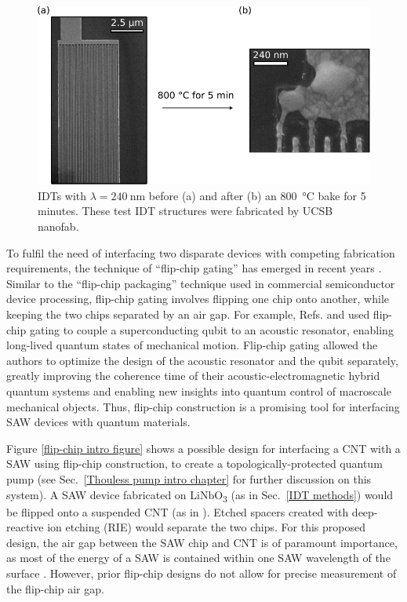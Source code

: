 \documentclass[double,12pt,1in,seploa]{beavtex}
\begin{document}
\begin{figure}
    \includegraphics{IDT damaged.pdf}
    \caption{IDTs with $\lambda = \SI{240}{\nano\meter}$ before (a) and after (b) an \SI{800}{\celsius} bake for 5 minutes. These test IDT structures were fabricated by UCSB nanofab.} 
    \label{IDT damaged}
\end{figure}

To fulfil the need of interfacing two disparate devices with competing fabrication requirements, the technique of “flip-chip gating” has emerged in recent years \cite{beukman_noninvasive_2015, chu_creation_2018, satzinger_quantum_2018, robertson_non-invasive_2020}. Similar to the “flip-chip packaging” technique used in commercial semiconductor device processing, flip-chip gating involves flipping one chip onto another, while keeping the two chips separated by an air gap. For example, Refs. \cite{chu_creation_2018} and \cite{satzinger_quantum_2018} used flip-chip gating to couple a superconducting qubit to an acoustic resonator, enabling long-lived quantum states of mechanical motion. Flip-chip gating allowed the authors to optimize the design of the acoustic resonator and the qubit separately, greatly improving the coherence time of their acoustic-electromagnetic hybrid quantum systems and enabling new insights into quantum control of macroscale mechanical objects. Thus, flip-chip construction is a promising tool for interfacing SAW devices with quantum materials.

Figure \ref{flip-chip intro figure} shows a possible design for interfacing a CNT with a SAW using flip-chip construction, to create a topologically-protected quantum pump (see Sec.\ \ref{Thouless pump intro chapter} for further discussion on this system). A SAW device fabricated on LiNbO\textsubscript{3} (as in Sec.\ \ref{IDT methods}) would be flipped onto a suspended CNT (as in \cite{senger_universal_2018}). Etched spacers created with deep-reactive ion etching (RIE) would separate the two chips. For this proposed design, the air gap between the SAW chip and CNT is of paramount importance, as most of the energy of a SAW is contained within one SAW wavelength of the surface \cite{wixforth_surface_1989}. However, prior flip-chip designs do not allow for precise measurement of the flip-chip air gap.
\end{document}
